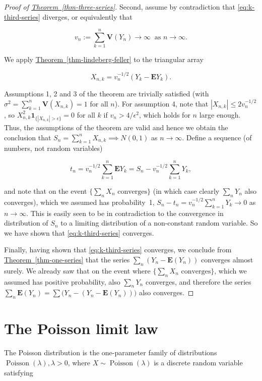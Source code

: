 \documentclass[11pt]{report}
\theoremstyle{plain}
\theoremstyle{definition}
\begin{document}
\begin{proof}[Proof of \texorpdfstring{\hyperref[thm-three-series]{Theorem~\ref*{thm-three-series}}}{Theorem}]
Second, assume by contradiction that
\eqref{eq:k-third-series} diverges, or equivalently that

\[
v_n := \sum_{k=1}^n \mathbf{V}(Y_n) \to \infty\ \textrm{ as }n\to\infty.
\]

\noindent We apply \hyperref[thm-lindeberg-feller]{Theorem~\ref*{thm-lindeberg-feller}} to the
triangular array

\[
X_{n,k} = v_n^{-1/2} \left(Y_k - \mathbf{E} Y_k\right).
\]

\noindent Assumptions 1, 2 and 3 of the theorem are trivially
satisfied (with
$\sigma^2 = \sum_{k=1}^n \mathbf{V}(X_{n,k}) = 1$ for
all $n$). For assumption 4, note that
$|X_{n,k}| \le 2 v_n^{-1/2}$, so
$X_{n,k}^2 \mathbf{1}_{\{|X_{n,k}|>\epsilon\}} = 0$
for all $k$ if $v_n > 4/\epsilon^2$, which holds for
$n$ large enough. Thus, the assumptions of the
theorem are valid and hence we obtain the conclusion
that $S_n=\sum_{k=1}^n X_{n,k} \implies N(0,1)$ as
$n\to\infty$. Define a sequence (of numbers, not
random variables)

\[
t_n = v_n^{-1/2} \sum_{k=1}^n \mathbf{E} Y_k = S_n - v_n^{-1/2}\sum_{k=1}^n Y_k,
\]

\noindent and note that on the event
$\{\sum_n X_n \textrm{ converges} \}$ (in which case
clearly $\sum_n Y_n$ also converges), which we
assumed has probability~1,
$S_n-t_n = v_n^{-1/2} \sum_{k=1}^n Y_k \to 0$ as
$n\to\infty$. This is easily seen to be in
contradiction to the convergence in distribution of
$S_n$ to a limiting distribution of a non-constant
random variable. So we have shown that
\eqref{eq:k-third-series} converges.

Finally, having shown that \eqref{eq:k-third-series}
converges, we conclude from \hyperref[thm-one-series]{Theorem~\ref*{thm-one-series}}
that the series
$\sum_n \left(Y_n-\mathbf{E}(Y_n)\right)$ converges
almost surely. We already saw that on the event where
$\{ \sum_n X_n \textrm{ converges}\}$, which we
assumed has positive probability, also $\sum_n Y_n$
converges, and therefore the series
$\sum_n \mathbf{E}(Y_n) = \sum \big(Y_n -
(Y_n-\mathbf{E}(Y_n))\big)$
also converges.
\end{proof}

\section{The Poisson limit law}
\label{sec:poisson-limit}

The Poisson distribution is the one-parameter family
of distributions
$\operatorname{Poisson}(\lambda), \lambda>0$, where
$X\sim \operatorname{Poisson}(\lambda)$ is a discrete
random variable satisfying
\end{document}
